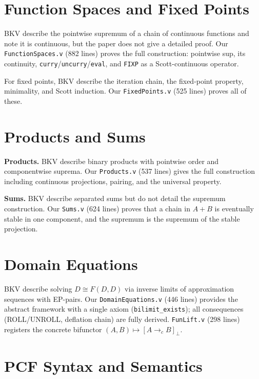 \section*{Function Spaces and Fixed Points}

BKV describe the pointwise supremum of a chain of continuous functions
and note it is continuous, but the paper does not give a detailed
proof.
Our \texttt{FunctionSpaces.v} (882 lines) proves the full construction:
pointwise sup, its continuity, \texttt{curry}/\texttt{uncurry}/\texttt{eval},
and \texttt{FIXP} as a Scott-continuous operator.

For fixed points, BKV describe the iteration chain, the fixed-point
property, minimality, and Scott induction.  Our \texttt{FixedPoints.v}
(525 lines) proves all of these.

\section*{Products and Sums}

\textbf{Products.}  BKV describe binary products with pointwise order
and componentwise suprema.  Our \texttt{Products.v} (537 lines) gives
the full construction including continuous projections, pairing, and
the universal property.

\textbf{Sums.}  BKV describe separated sums but do not detail the
supremum construction.  Our \texttt{Sums.v} (624 lines) proves that
a chain in $A + B$ is eventually stable in one component, and the
supremum is the supremum of the stable projection.

\section*{Domain Equations}

BKV describe solving $D \cong F(D, D)$ via inverse limits of
approximation sequences with EP-pairs.  Our
\texttt{DomainEquations.v} (446 lines) provides the abstract framework
with a single axiom (\texttt{bilimit\_exists}); all consequences
(ROLL/UNROLL, deflation chain) are fully derived.
\texttt{FunLift.v} (298 lines) registers the concrete bifunctor
$(A, B) \mapsto [A \to_c B]_\bot$.

\section*{PCF Syntax and Semantics}

